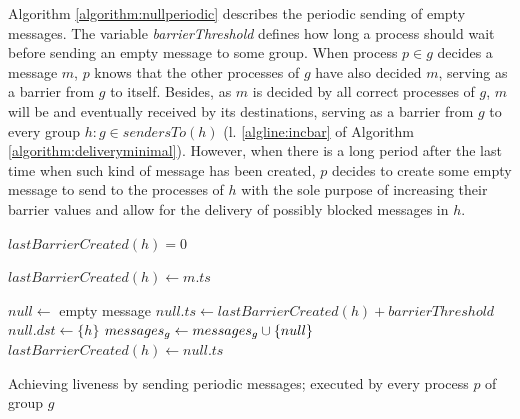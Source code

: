 \documentclass[times, 10pt]{article}
\begin{document}
Algorithm \ref{algorithm:nullperiodic} describes the periodic sending of empty messages. The variable \mbox{\textit{barrierThreshold}} defines how long a process should wait before sending an empty message to some group. When process $p \in g$ decides a message $m$, $p$ knows that the other processes of $g$ have also decided $m$, serving as a barrier from $g$ to itself. Besides, as $m$ is decided by all correct processes of $g$, $m$ will be \rmcast{} and eventually received by its destinations, serving as a barrier from $g$ to every group $h : g \in sendersTo(h)$ (l. \ref{algline:incbar} of Algorithm \ref{algorithm:deliveryminimal}). However, when there is a long period after the last time when such kind of message has been created, $p$ decides to create some empty message to send to the processes of $h$ with the sole purpose of increasing their barrier values and allow for the delivery of possibly blocked messages in $h$.

\begin{algorithm}
\begin{distribalgo}[1]
\blankline
{}
    \STATE $lastBarrierCreated(h) = 0$
  \ENDINDENT
\ENDINDENT

\blankline
{}
    \STATE $lastBarrierCreated(h) \leftarrow m.ts$
  \ENDINDENT  
\ENDINDENT

\blankline
{}
  \STATE $null \leftarrow$ empty message
  \STATE $null.ts \leftarrow lastBarrierCreated(h) + barrierThreshold$ \label{algline:samenullid}
  \STATE $null.dst \leftarrow \{h\}$ 
  \STATE $messages\text{$_g$} \leftarrow messages\text{$_g$} \cup \{null\}$ \label{algline:enqnull}
  \STATE $lastBarrierCreated(h) \leftarrow null.ts$
\ENDINDENT 

\blankline
\caption{Achieving liveness by sending periodic messages; executed by every process $p$ of group $g$}
\label{algorithm:nullperiodic}
\end{distribalgo} 
\end{algorithm}
\end{document}
